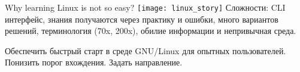\begin{frame}{Why learning Linux is not so easy?}
         \center\texttt{[image: linux\_story]} 
    \break
Сложности: CLI интерфейс, знания получаются через практику и ошибки, много вариантов решений, терминология (70x, 200x), обилие информации и непривычная среда.
	\begin{center}
		\large
		Обеспечить быстрый старт в среде GNU/Linux для опытных пользователей. Понизить порог вхождения. Задать направление. 
	\end{center} 
\end{frame}
